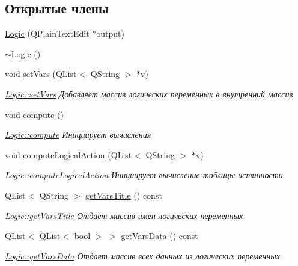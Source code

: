\subsection*{Открытые члены}
\begin{DoxyCompactItemize}
\item 
\hyperlink{class_logic_a9fb0198e941a32f25cb110875751f78e}{Logic} (Q\+Plain\+Text\+Edit $\ast$output)
\item 
\hyperlink{class_logic_a406131db5b87e8d4b396aec37f3c1f69}{$\sim$\+Logic} ()
\item 
void \hyperlink{class_logic_af592736369fd989be41c59b4e7315ab5}{set\+Vars} (Q\+List$<$ Q\+String $>$ $\ast$v)
\begin{DoxyCompactList}\small\item\em \hyperlink{class_logic_af592736369fd989be41c59b4e7315ab5}{Logic\+::set\+Vars} Добавляет массив логических переменных в внутренний массив \end{DoxyCompactList}\item 
void \hyperlink{class_logic_a17bd98c66121d7739f11af12affdb64b}{compute} ()
\begin{DoxyCompactList}\small\item\em \hyperlink{class_logic_a17bd98c66121d7739f11af12affdb64b}{Logic\+::compute} Инициирует вычисления \end{DoxyCompactList}\item 
void \hyperlink{class_logic_a7eae2f1ccdc24932e795b33906b501b7}{compute\+Logical\+Action} (Q\+List$<$ Q\+String $>$ $\ast$v)
\begin{DoxyCompactList}\small\item\em \hyperlink{class_logic_a7eae2f1ccdc24932e795b33906b501b7}{Logic\+::compute\+Logical\+Action} Инициирует вычисление таблицы истинности \end{DoxyCompactList}\item 
Q\+List$<$ Q\+String $>$ \hyperlink{class_logic_a0887d38c17058d50c4d8a3b7a8fc44ac}{get\+Vars\+Title} () const
\begin{DoxyCompactList}\small\item\em \hyperlink{class_logic_a0887d38c17058d50c4d8a3b7a8fc44ac}{Logic\+::get\+Vars\+Title} Отдает массив имен логических переменных \end{DoxyCompactList}\item 
Q\+List$<$ Q\+List$<$ bool $>$ $>$ \hyperlink{class_logic_a42630bbe8bded25027014e9f0b2a085e}{get\+Vars\+Data} () const
\begin{DoxyCompactList}\small\item\em \hyperlink{class_logic_a42630bbe8bded25027014e9f0b2a085e}{Logic\+::get\+Vars\+Data} Отдает массив всех данных из логических переменных \end{DoxyCompactList}\item 

\end{DoxyCompactItemize}
